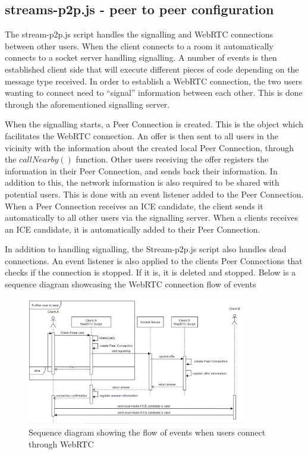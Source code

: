 \subsection{streams-p2p.js - peer to peer configuration}
The stream-p2p.js script handles the signalling and WebRTC connections between other users. When the client connects to a room it automatically connects to a socket server handling signalling. A number of events is then established client side that will execute different pieces of code depending on the message type received. In order to establish a WebRTC connection, the two users wanting to connect need to “signal” information between each other. This is done through the aforementioned signalling server. 

When the signalling starts, a Peer Connection is created. This is the object which facilitates the WebRTC connection. An offer is then sent to all users in the vicinity with the information about the created local Peer Connection, through the $callNearby()$ function. Other users receiving the offer registers the information in their Peer Connection, and sends back their information. In addition to this, the network information is also required to be shared with potential users. This is done with an event listener added to the Peer Connection. When a Peer Connection receives an ICE candidate, the client sends it automatically to all other users via the signalling server. When a clients receives an ICE candidate, it is automatically added to their Peer Connection.

In addition to handling signalling, the Stream-p2p.js script also handles dead connections. An event listener is also applied to the clients Peer Connections that checks if the connection is stopped. If it is, it is deleted and stopped. Below is a sequence diagram showcasing the WebRTC connection flow of events

\begin{figure}[ht]
    \centering
    \includegraphics[width=0.85\textwidth]{Pictures/streams-p2p sequence.png}
    \caption{Sequence diagram showing the flow of events when users connect through WebRTC}
    \label{fig:gantt}
\end{figure}

